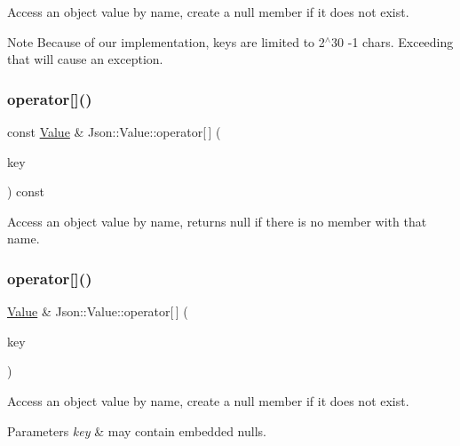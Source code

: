 Access an object value by name, create a null member if it does not exist. \begin{DoxyNote}{Note}
Because of our implementation, keys are limited to 2$^\wedge$30 -\/1 chars. Exceeding that will cause an exception. 
\end{DoxyNote}
\mbox{\label{classJson_1_1Value_a1b0498b7b2a520a68137f682d91abdd5}} 
\subsubsection{\texorpdfstring{operator[]()}{operator[]()}\hspace{0.1cm}{\footnotesize\ttfamily [6/9]}}
{\footnotesize\ttfamily const \hyperlink{classJson_1_1Value}{Value} \& Json\+::\+Value\+::operator\mbox{[}$\,$\mbox{]} (\begin{DoxyParamCaption}\item[{const char $\ast$}]{key }\end{DoxyParamCaption}) const}

Access an object value by name, returns null if there is no member with that name. \mbox{\label{classJson_1_1Value_aedd1e152756a4cc8c1ebac0dd7aeeb78}} 
\subsubsection{\texorpdfstring{operator[]()}{operator[]()}\hspace{0.1cm}{\footnotesize\ttfamily [7/9]}}
{\footnotesize\ttfamily \hyperlink{classJson_1_1Value}{Value} \& Json\+::\+Value\+::operator\mbox{[}$\,$\mbox{]} (\begin{DoxyParamCaption}\item[{const J\+S\+O\+N\+C\+P\+P\+\_\+\+S\+T\+R\+I\+NG \&}]{key }\end{DoxyParamCaption})}

Access an object value by name, create a null member if it does not exist. 
\begin{DoxyParams}{Parameters}
{\em key} & may contain embedded nulls. \\
\hline
\end{DoxyParams}
\mbox{\label{classJson_1_1Value_aba60f69dcd85e935aa85e7a517e03427}} 
